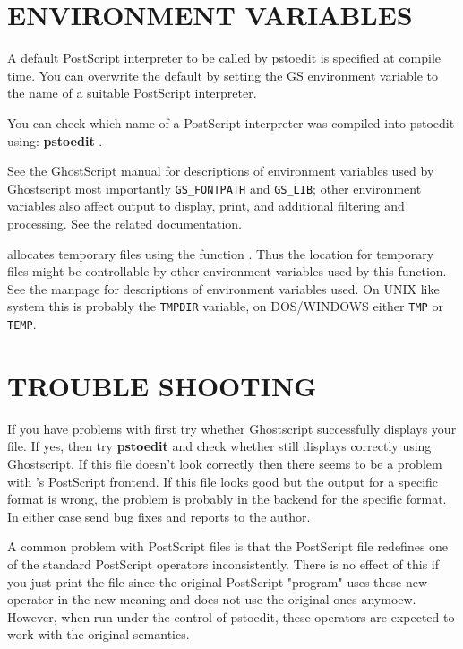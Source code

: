 \documentclass[english,a4paper]{article}
\begin{document}
\section{ENVIRONMENT VARIABLES}

A default PostScript interpreter to be called by pstoedit is specified at
compile time. You can overwrite the default by setting the GS environment
variable to the name of a suitable PostScript interpreter.

You can check which name of a PostScript interpreter was compiled into
pstoedit using: \textbf{pstoedit} .

See the GhostScript manual for descriptions of environment variables used by
Ghostscript most importantly \verb+GS_FONTPATH+ and \verb+GS_LIB+; other
environment variables also affect output to display, print, and additional
filtering and processing. See the related documentation.

 allocates temporary files using the function .
Thus the location for temporary files might be controllable by other
environment variables used by this function. See the  manpage
for descriptions of environment variables used. On UNIX like system this is
probably the \verb+TMPDIR+ variable, on DOS/WINDOWS either \verb+TMP+ or
\verb+TEMP+.

\section{TROUBLE SHOOTING}

If you have problems with  first try whether Ghostscript
successfully displays your file. If yes, then try 
\textbf{pstoedit}    
and check whether  still displays correctly using
Ghostscript. If this file doesn't look correctly then there seems to be a
problem with 's PostScript frontend. If this file looks good
but the output for a specific format is wrong, the problem is probably in
the backend for the specific format. In either case send bug fixes and
reports to the author.

A common problem with PostScript files is that the PostScript file redefines
one of the standard PostScript operators inconsistently. There is no effect
of this if you just print the file since the original PostScript "program"
uses these new operator in the new meaning and does not use the original
ones anymoew. However, when run under the control of pstoedit, these
operators are expected to work with the original semantics.
\end{document}
